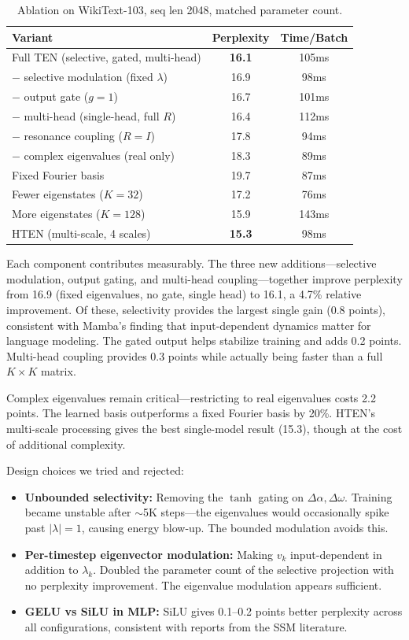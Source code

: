 \documentclass{article}
\begin{document}
\begin{table}[h]
\centering
\caption{Ablation on WikiText-103, seq len 2048, matched parameter count.}
\label{tab:ablation}
\begin{tabular}{lcc}
\toprule
Variant & Perplexity & Time/Batch \\
\midrule
Full TEN (selective, gated, multi-head) & \textbf{16.1} & 105ms \\
\quad $-$ selective modulation (fixed $\lambda$) & 16.9 & 98ms \\
\quad $-$ output gate ($g = 1$) & 16.7 & 101ms \\
\quad $-$ multi-head (single-head, full $R$) & 16.4 & 112ms \\
\quad $-$ resonance coupling ($R = I$) & 17.8 & 94ms \\
\quad $-$ complex eigenvalues (real only) & 18.3 & 89ms \\
Fixed Fourier basis & 19.7 & 87ms \\
Fewer eigenstates ($K = 32$) & 17.2 & 76ms \\
More eigenstates ($K = 128$) & 15.9 & 143ms \\
HTEN (multi-scale, 4 scales) & \textbf{15.3} & 98ms \\
\bottomrule
\end{tabular}
\end{table}

Each component contributes measurably. The three new additions---selective modulation, output gating, and multi-head coupling---together improve perplexity from 16.9 (fixed eigenvalues, no gate, single head) to 16.1, a 4.7\% relative improvement. Of these, selectivity provides the largest single gain (0.8 points), consistent with Mamba's finding that input-dependent dynamics matter for language modeling. The gated output helps stabilize training and adds 0.2 points. Multi-head coupling provides 0.3 points while actually being faster than a full $K \times K$ matrix.

Complex eigenvalues remain critical---restricting to real eigenvalues costs 2.2 points. The learned basis outperforms a fixed Fourier basis by 20\%. HTEN's multi-scale processing gives the best single-model result (15.3), though at the cost of additional complexity.

Design choices we tried and rejected:
\begin{itemize}[nosep]
\item \textbf{Unbounded selectivity:} Removing the $\tanh$ gating on $\Delta\alpha, \Delta\omega$. Training became unstable after $\sim$5K steps---the eigenvalues would occasionally spike past $|\lambda| = 1$, causing energy blow-up. The bounded modulation avoids this.
\item \textbf{Per-timestep eigenvector modulation:} Making $v_k$ input-dependent in addition to $\lambda_k$. Doubled the parameter count of the selective projection with no perplexity improvement. The eigenvalue modulation appears sufficient.
\item \textbf{GELU vs SiLU in MLP:} SiLU gives 0.1--0.2 points better perplexity across all configurations, consistent with reports from the SSM literature.
\end{itemize}
\end{document}
